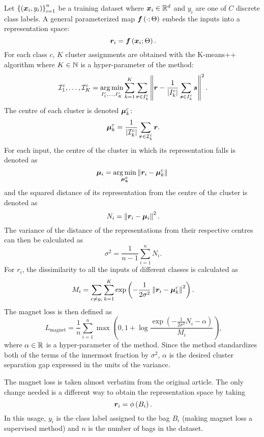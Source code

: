 Let \( \left\{ \left( \bm{x}_i, y_i \right) \right\}_{i = 1}^n \) be a training dataset where \( \bm{x}_i \in \mathbb{R}^d \) and \( y_i \) are one of \( C \) discrete class labels. A general parameterized map \( \bm{f} \left( \cdot; \Theta \right) \) embeds the inputs into a representation space:
\[ \phantom{.}\bm{r}_i = \bm{f} \left( \bm{x}_i; \Theta \right). \]
For each class \( c \), \( K \) cluster assignments are obtained with the K-means++ algorithm \cite{macqueen_methods_1967, arthur_k-means++:_2006} where \( K \in \mathbb{N} \) is a hyper-parameter of the method:
\[ \phantom{.}\mathcal{I}_1^c, \dots, \mathcal{I}_K^c = \operatorname*{arg\,min}_{I_1^c, \dots, I_K^c} \sum_{k = 1}^K \sum_{\bm{r} \in I_k^c} \left\lVert \bm{r} - \frac{1}{\left\lvert I_k^c \right\rvert} \sum_{\bm{s} \in I_k^c} \bm{s} \right\rVert^2. \]
The centre of each cluster is denoted \( \bm{\mu}_k^c \):
\[ \phantom{.}\bm{\mu}_k^c = \frac{1}{\left\lvert \mathcal{I}_k^c \right\rvert} \sum_{\bm{r} \in \mathcal{I}_k^c} \bm{r}. \]
For each input, the centre of the cluster in which its representation falls is denoted as
\[ \bm{\mu}_i = \operatorname*{arg\,min}_{\bm{\mu_k^c}} \left\lVert \bm{r}_i - \bm{\mu}_k^c \right\rVert \]
and the squared distance of its representation from the centre of the cluster is denoted as
\[ \phantom{.}N_i = \left\lVert \bm{r}_i - \bm{\mu}_i \right\rVert^2. \]
The variance of the distance of the representations from their respective centres can then be calculated as
\[ \phantom{.}\sigma^2 = \frac{1}{n - 1} \sum_{i = 1}^n N_i. \]
For \( r_i \), the dissimilarity to all the inputs of different classes is calculated as
\[ \phantom{.}M_i = \sum_{c \neq y_i} \sum_{k = 1}^K \exp \left( - \frac{1}{2 \sigma^2} \left\lVert \bm{r}_i - \bm{\mu}_k^c \right\rVert^2 \right). \]
The magnet loss is then defined as
\begin{equation}
	\phantom{,}L_\mathrm{magnet} = \frac{1}{n} \sum_{i = 1}^n \max \left( 0, 1 + \log \frac{\exp \left( - \frac{1}{2 \sigma^2} N_i - \alpha \right)}{M_i} \right),
\end{equation}
where \( \alpha \in \mathbb{R} \) is a hyper-parameter of the method. Since the method standardizes both of the terms of the innermost fraction by \( \sigma^2 \), \( \alpha \) is the desired cluster separation gap expressed in the units of the variance.

The magnet loss is taken almost verbatim from the original article. The only change needed is a different way to obtain the representation space by taking
\[ \phantom{.}\bm{r}_i = \phi \left( B_i \right). \]
In this usage, \( y_i \) is the class label assigned to the bag \( B_i \) (making magnet loss a supervised method) and \( n \) is the number of bags in the dataset.

